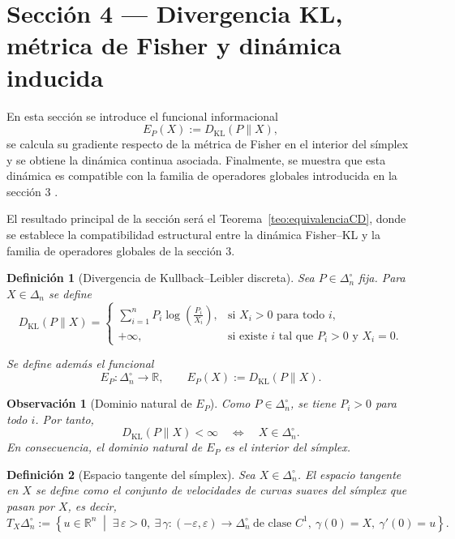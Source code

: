 \documentclass[12pt]{article}
\newtheorem{definicion}{Definición}[section]
\newtheorem{observacion}{Observación}[section]
\begin{document}
\section{Sección 4 — Divergencia KL, métrica de Fisher y dinámica inducida}

En esta sección  se introduce el funcional informacional
\[
E_P(X):=D_{\mathrm{KL}}(P\|X),
\]
se calcula su gradiente respecto de la métrica de Fisher en el interior del símplex y se obtiene la dinámica continua asociada. Finalmente, se muestra que esta dinámica es compatible con la familia de operadores globales introducida en la sección 3 .

El resultado principal de la sección  será el Teorema~\ref{teo:equivalenciaCD}, donde se establece la compatibilidad estructural entre la dinámica Fisher--KL y la familia de operadores globales de la sección 3.

\begin{definicion}[Divergencia de Kullback--Leibler discreta]\label{def:KL}
Sea $P\in\Delta_n^\circ$ fija. Para $X\in\Delta_n$ se define
\[
D_{\mathrm{KL}}(P\|X)
=
\begin{cases}
\displaystyle \sum_{i=1}^n P_i\log\!\left(\frac{P_i}{X_i}\right),
& \text{si } X_i>0 \text{ para todo } i,\\[1em]
+\infty,
& \text{si existe } i \text{ tal que } P_i>0 \text{ y } X_i=0.
\end{cases}
\]

Se define además el funcional
\[
E_P:\Delta_n^\circ\to\mathbb R,
\qquad
E_P(X):=D_{\mathrm{KL}}(P\|X).
\]
\end{definicion}

\begin{observacion}[Dominio natural de $E_P$]\label{obs:KLsoporte}
Como $P\in\Delta_n^\circ$, se tiene $P_i>0$ para todo $i$. Por tanto,
\[
D_{\mathrm{KL}}(P\|X)<\infty
\quad\Longleftrightarrow\quad
X\in\Delta_n^\circ.
\]
En consecuencia, el dominio natural de $E_P$ es el interior del símplex.
\end{observacion}

\begin{definicion}[Espacio tangente del símplex]\label{def:tangente}
Sea $X\in\Delta_n^\circ$. El \emph{espacio tangente en $X$} se define como el conjunto de velocidades de curvas suaves del símplex que pasan por $X$, es decir,
\[
T_X\Delta_n^\circ
:=
\left\{
u\in\mathbb R^n
\;\middle|\;
\exists\,\varepsilon>0,\ \exists\,\gamma:(-\varepsilon,\varepsilon)\to\Delta_n^\circ
\ \text{de clase } C^1,\ 
\gamma(0)=X,\ 
\gamma'(0)=u
\right\}.
\]
\end{definicion}
\end{document}
